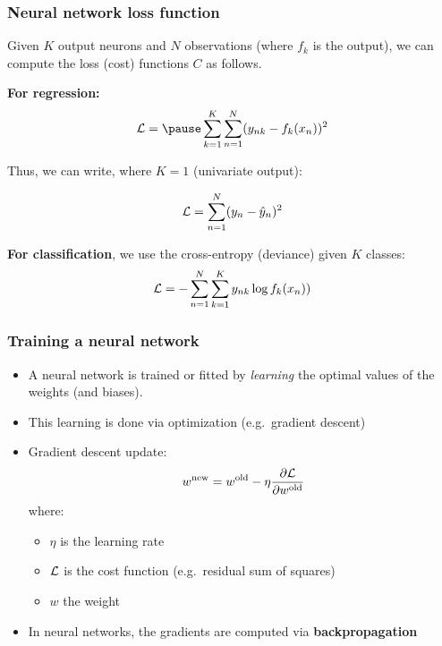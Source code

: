 \documentclass[smaller]{beamer}
\begin{document}
\begin{frame}
  \frametitle{Neural network loss function}
  \pause
  Given $K$ output neurons and $N$ observations (where   $f_k$ is the output),
  we can compute the loss (cost) functions $C$ as follows. \pause

  \medskip
  
  \textbf{For regression:}
  \begin{equation}
    \mc{L} = \pause \sum_{k=1}^K\sum_{n=1}^N(y_{nk} - f_k(x_n))^2
  \end{equation}

  \pause

  
  Thus, we can write, where $K=1$ (univariate output):

  \begin{equation}
        \mathcal{L} = \sum_{n=1}^N (y_n - \hat y_n)^2
  \end{equation}
  
  \medskip
  
  \textbf{For classification}, we use the cross-entropy (deviance) given $K$ classes:\pause
  \begin{equation}
       \mathcal{L} = - \sum_{n=1}^N\sum_{k=1}^Ky_{nk} \log f_k(x_n))
  \end{equation}

  \pause

\end{frame}

\begin{frame}
  \frametitle{Training a neural network}\pause
  
  \begin{itemize}[<+->]
  \item A neural network is trained or fitted by \textit{learning} the optimal values of the weights (and biases).
  \item This learning is done via optimization (e.g.\ gradient descent)
  \item Gradient descent update: \pause
    \begin{equation}
      w^{\text{new}} = w^{\text{old}} - \eta \frac{\partial{\mathcal{L}}}{\partial{w^{\text{old}}}}
    \end{equation}
    \pause
    where:
    \begin{itemize}[<+->]
    \item $\eta$ is the learning rate
    \item $\mathcal{L}$ is the cost function (e.g.\ residual sum of squares)
    \item $w$ the weight
  \end{itemize}

  \item In neural networks, the gradients are computed via \textbf{\bl backpropagation}
  \end{itemize}
\end{frame}
\end{document}
